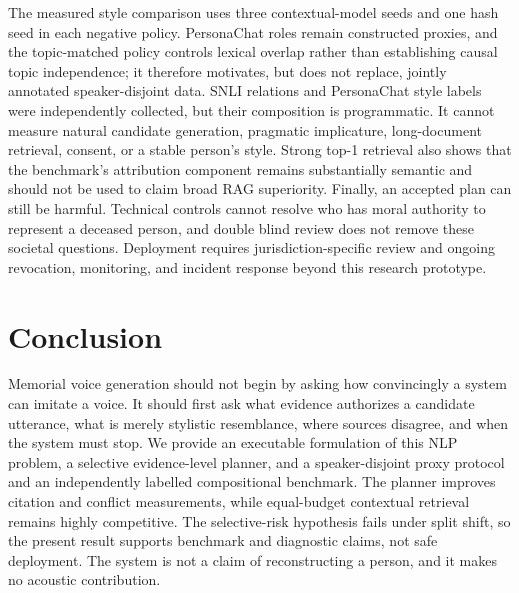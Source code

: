\documentclass[11pt,a4paper]{article}
\begin{document}
The measured style comparison uses three contextual-model seeds and one hash
seed in each negative policy.  PersonaChat roles remain constructed proxies,
and the topic-matched policy controls lexical overlap rather than establishing
causal topic independence; it therefore motivates, but does not replace,
jointly annotated speaker-disjoint data.
SNLI relations and PersonaChat style labels were independently collected, but
their composition is programmatic.  It cannot measure natural candidate
generation, pragmatic implicature, long-document retrieval, consent, or a
stable person's style.  Strong top-1 retrieval also shows that the benchmark's
attribution component remains substantially semantic and should not be used to
claim broad RAG superiority.
Finally, an accepted plan can still be harmful.  Technical controls cannot
resolve who has moral authority to represent a deceased person, and double
blind review does not remove these societal questions.  Deployment requires
jurisdiction-specific review and ongoing revocation, monitoring, and incident
response beyond this research prototype.

\section{Conclusion}

Memorial voice generation should not begin by asking how convincingly a system
can imitate a voice.  It should first ask what evidence authorizes a candidate
utterance, what is merely stylistic resemblance, where sources disagree, and
when the system must stop.  We provide an executable formulation of this NLP
problem, a selective evidence-level planner, and a speaker-disjoint proxy
protocol and an independently labelled compositional benchmark.  The planner
improves citation and conflict measurements, while equal-budget contextual
retrieval remains highly competitive.  The selective-risk hypothesis fails
under split shift, so the present result supports benchmark and diagnostic
claims, not safe deployment.  The system is not a claim of reconstructing a
person, and it makes no acoustic contribution.



\end{document}
